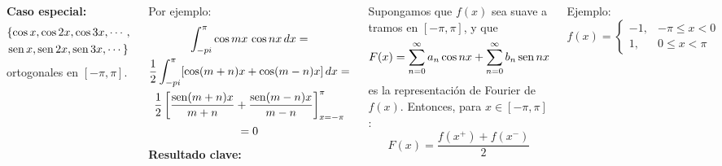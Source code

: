 \documentclass[9pt, aspectratio=169]{beamer}
\begin{document}
\begin{frame}
\begin{columns}[t]
\cx
\textbf{Caso especial:}
\begin{multline*}
\{\cos x, \cos 2x, \cos 3x, \cdots, \\
\operatorname{sen} x, \operatorname{sen} 2x, \operatorname{sen} 3x,  \cdots \} 
\end{multline*}
ortogonales en $[-\pi, \pi]$.

Por ejemplo:
\begin{multline*}
\int_{-pi}^{\pi} \cos mx \, \cos nx \, dx = \\
\frac{1}{2} \int_{-pi}^{\pi} [\cos(m + n) x + \cos(m - n) x] \, dx = \\
\frac{1}{2} \left[ \frac{\operatorname{sen}(m + n) x}{m + n} + \frac{\operatorname{sen}(m-n) x}{m - n} \right]_{x = -\pi}^{\pi} \\
= 0
\end{multline*}
\cx
\textbf{Resultado clave:}

Supongamos que $f(x)$ sea suave a tramos en $[-\pi, \pi]$, y que
\[ F(x) = \sum_{n = 0}^{\infty} a_n \cos nx + \sum_{n = 0}^{\infty} b_n \operatorname{sen} nx \]
es la representación de Fourier de $f(x)$. Entonces, para $x \in [-\pi, \pi]$:
\[ F(x) = \frac{f(x^+) + f(x^-)}{2} \]

\begin{exampleblock}{Ejemplo:}
    \begin{equation*}
        f(x) = \begin{cases}
            -1, &-\pi \leq x < 0 \\
            1, &0 \leq x < \pi
        \end{cases}
    \end{equation*}
\end{exampleblock}
\end{columns}
\end{frame}
\end{document}
